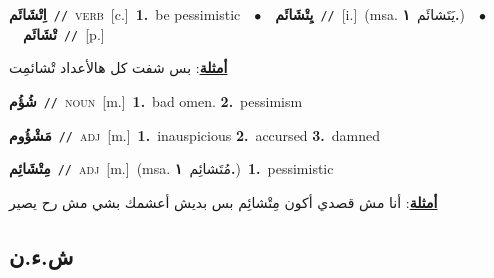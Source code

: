 \documentclass[10pt,a4paper,twoside]{article} %
\begin{document}
\begin{multicols}{2}
{\setlength\topsep{0pt}\textbf{\foreignlanguage{arabic}{اِتْشَائَم}}\ {\color{gray}\texttt{//}\color{black}}\ \textsc{verb}\ [c.]\ \textbf{1.}~be pessimistic\ \ $\bullet$\ \ \setlength\topsep{0pt}\textbf{\foreignlanguage{arabic}{يِتْشَائَم}}\ {\color{gray}\texttt{//}\color{black}}\ [i.]\ \color{gray}(msa. \foreignlanguage{arabic}{يَتَشائَم}~\foreignlanguage{arabic}{\textbf{١.}})\color{black}\ \ $\bullet$\ \ \setlength\topsep{0pt}\textbf{\foreignlanguage{arabic}{تْشَائَم}}\ {\color{gray}\texttt{//}\color{black}}\ [p.]\  \begin{flushright}\color{gray}\foreignlanguage{arabic}{\textbf{\underline{\foreignlanguage{arabic}{أمثلة}}}: بس شفت كل هالأعداد تْشائمِت}\end{flushright}\color{black}} \vspace{2mm}

{\setlength\topsep{0pt}\textbf{\foreignlanguage{arabic}{شُؤُم}}\ {\color{gray}\texttt{//}\color{black}}\ \textsc{noun}\ [m.]\ \textbf{1.}~bad omen.  \textbf{2.}~pessimism\ 

{\setlength\topsep{0pt}\textbf{\foreignlanguage{arabic}{مَشْؤُوم}}\ {\color{gray}\texttt{//}\color{black}}\ \textsc{adj}\ [m.]\ \textbf{1.}~inauspicious  \textbf{2.}~accursed  \textbf{3.}~damned\ 

{\setlength\topsep{0pt}\textbf{\foreignlanguage{arabic}{مِتْشَائِم}}\ {\color{gray}\texttt{//}\color{black}}\ \textsc{adj}\ [m.]\ \color{gray}(msa. \foreignlanguage{arabic}{مُتَشائِم}~\foreignlanguage{arabic}{\textbf{١.}})\color{black}\ \textbf{1.}~pessimistic\  \begin{flushright}\color{gray}\foreignlanguage{arabic}{\textbf{\underline{\foreignlanguage{arabic}{أمثلة}}}: أنا مش قصدي أكون مِتْشائِم بس بديش أعشمك بشي مش رح يصير}\end{flushright}\color{black}} \vspace{2mm}

\vspace{-3mm}
\subsection*{\color{blue}\foreignlanguage{arabic}{ش.ء.ن}\color{blue}{}} 

}}
\end{multicols}
\end{document}
